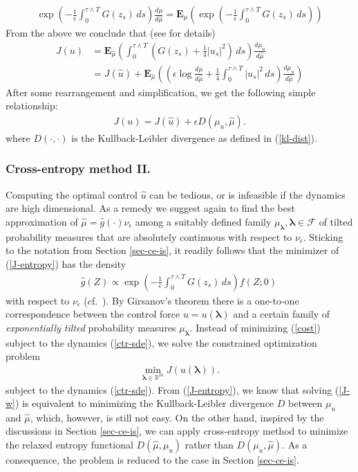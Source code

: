 \documentclass[final]{siamltex}
\newcommand{\cF}{{\mathcal F}}
\newcommand{\bE}{{\mathbf E}}
\newcommand{\eps}{\epsilon}
\newcommand{\blambda}{\bm{\lambda}}
\newcommand{\wrt}{with respect to }
\begin{document}
    \begin{align}
    \exp\left(-\frac{1}{\eps}\int_0^{\tau\wedge T} G(z_s)\,ds\right)\frac{d\mu}{d\hat{\mu}} =
    \bE_\mu\left(\exp\left(-\frac{1}{\eps}\int_0^{\tau\wedge T} G(z_s)\, ds\right)\right) 
    \label{jensen-as}
  \end{align}
From the above we conclude that (see \cite[Sec.~VI.3]{fleming2006} for details)
  \begin{equation}\label{cost-2}
  \begin{aligned}
    J(u) &= \bE_{\hat{\mu}}\!\left(\int_0^{\tau\wedge T} \left(G(z_s) + \frac{1}{4} |u_{s}|^2\right)\,ds\right)\frac{d\mu_u}{d\hat{\mu}}  \\
    & = J(\hat{u}) + \bE_{\hat{\mu}}\!\left(\left(\eps \log
    \frac{d\mu}{d\hat{\mu}} + \frac{1}{4} \int_0^{\tau\wedge T} |u_{s}|^2\,ds\right)\frac{d\mu_u}{d\hat{\mu}}\right)
\end{aligned}
\end{equation}
After some rearrangement and simplification, we get the following simple relationship: 
\begin{align}
J(u) = J(\hat{u}) + \eps D(\mu_u, \hat{\mu}).
\label{J-entropy}
\end{align}
where $D(\cdot, \cdot)$ is the Kullback-Leibler divergence as defined in (\ref{kl-dist}).

\subsubsection*{Cross-entropy method II.}
%
Computing the optimal control $\hat{u}$ can be tedious, or is infeasible if the dynamics are 
high dimensional. As a remedy we suggest again to find the best approximation of $\hat{\mu}=\hat{g}(\cdot)\nu_{\eps}$ among a suitably 
defined family $\mu_{\blambda}, \blambda \in \cF$ of tilted probability measures that are absolutely continuous \wrt $\nu_{\eps}$. 
%
Sticking to the notation from Section \ref{sec-ce-is}, it readily follows that the minimizer of (\ref{J-entropy}) has the density   
\begin{align}
  \hat{g}(Z) \propto \exp\left(-\frac{1}{\eps}\int_0^{\tau\wedge T} G(z_s) \,ds\right) f(Z; 0)\,
\end{align}
\wrt $\nu_{\eps}$ (cf.~\pageref{optimal-pdf}). By Girsanov's theorem
there is a one-to-one correspondence between the control force $u=u(\blambda)$ and a certain family of \emph{exponentially tilted} probability measures $\mu_{\blambda}$. 
Instead of minimizing (\ref{cost}) subject to the dynamics (\ref{ctr-sde}), we solve the constrained optimization problem  
\begin{align}
  \min_{\blambda \in \mathbb{R}^m} J(u(\blambda)).
  \label{J-w}
\end{align}
subject to the dynamics (\ref{ctr-sde}). From (\ref{J-entropy}), we know that solving (\ref{J-w})
is equivalent to minimizing the Kullback-Leibler divergence $D$ between
$\mu_u$ and $\hat{\mu}$, which, however, is still not easy. On the other hand, inspired by 
the discussions in Section \ref{sec-ce-is}, we can apply cross-entropy method 
to minimize the relaxed entropy functional $D(\hat{\mu}, \mu_u)$ rather than $D(\mu_{u},\hat{\mu})$. As a consequence, 
the problem is reduced to the case in Section \ref{sec-ce-is}. 
\end{document}
